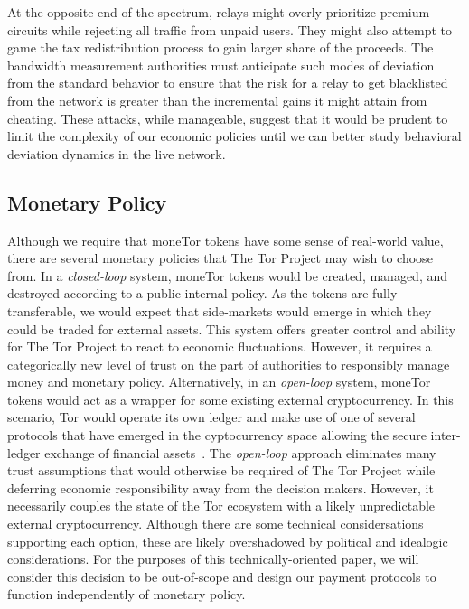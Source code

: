 At the opposite end of the spectrum, relays might overly prioritize premium
circuits while rejecting all traffic from unpaid users. They might also attempt
to game the tax redistribution process to gain larger share of the proceeds. The
bandwidth measurement authorities must anticipate such modes of deviation from
the standard behavior to ensure that the risk for a relay to get blacklisted
from the network is greater than the incremental gains it might attain from
cheating. These attacks, while manageable, suggest that it would be prudent to
limit the complexity of our economic policies until we can better study
behavioral deviation dynamics in the live network.


\subsection{Monetary Policy}

Although we require that moneTor tokens have some sense of real-world value,
there are several monetary policies that The Tor Project may wish to choose
from. In a \emph{closed-loop} system, moneTor tokens would be created, managed,
and destroyed according to a public internal policy. As the tokens are fully
transferable, we would expect that side-markets would emerge in which they could
be traded for external assets. This system offers greater control and ability
for The Tor Project to react to economic fluctuations. However, it requires a
categorically new level of trust on the part of authorities to responsibly
manage money and monetary policy. Alternatively, in an \emph{open-loop} system,
moneTor tokens would act as a wrapper for some existing external
cryptocurrency. In this scenario, Tor would operate its own ledger and make use
of one of several protocols that have emerged in the cyptocurrency space
allowing the secure inter-ledger exchange of financial
assets~\cite{back2014enabling, poon2017plasma}. The \emph{open-loop} approach
eliminates many trust assumptions that would otherwise be required of The Tor
Project while deferring economic responsibility away from the decision
makers. However, it necessarily couples the state of the Tor ecosystem with a
likely unpredictable external cryptocurrency. Although there are some technical
considersations supporting each option, these are likely overshadowed by
political and idealogic considerations. For the purposes of this
technically-oriented paper, we will consider this decision to be out-of-scope
and design our payment protocols to function independently of monetary policy.

